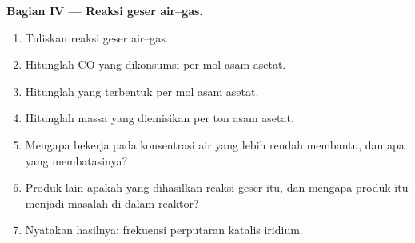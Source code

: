 \begin{problem}
\medskip\noindent\textbf{Bagian IV --- Reaksi geser air--gas.}
\begin{enumerate}[resume, beginpenalty=10000]
  \item Tuliskan reaksi geser air--gas.
  \item Hitunglah CO yang dikonsumsi per mol asam asetat.
  \item Hitunglah  yang terbentuk per mol asam asetat.
  \item Hitunglah massa  yang diemisikan per ton asam asetat.
  \item Mengapa bekerja pada konsentrasi air yang lebih rendah membantu, dan apa yang membatasinya?
  \item Produk lain apakah yang dihasilkan reaksi geser itu, dan mengapa produk itu menjadi masalah di dalam
        reaktor?
  \item Nyatakan hasilnya: frekuensi perputaran katalis iridium.
\end{enumerate}
\end{problem}
